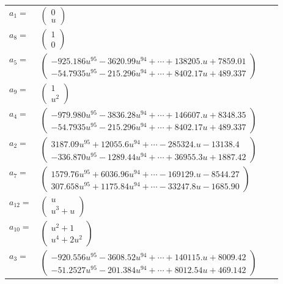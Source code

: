 \documentclass[1p]{elsarticle_modified}
\theoremstyle{definition}
\begin{document}
\begin{tabular}{m{7pt} m{180pt} m{7pt} m{180pt} }
\flushright $a_{1}=$&$\begin{pmatrix}0\\u\end{pmatrix}$ \\
\flushright $a_{8}=$&$\begin{pmatrix}1\\0\end{pmatrix}$ \\
\flushright $a_{5}=$&$\begin{pmatrix}-925.186 u^{95}-3620.99 u^{94}+\cdots+138205. u+7859.01\\-54.7935 u^{95}-215.296 u^{94}+\cdots+8402.17 u+489.337\end{pmatrix}$ \\
\flushright $a_{9}=$&$\begin{pmatrix}1\\u^2\end{pmatrix}$ \\
\flushright $a_{4}=$&$\begin{pmatrix}-979.980 u^{95}-3836.28 u^{94}+\cdots+146607. u+8348.35\\-54.7935 u^{95}-215.296 u^{94}+\cdots+8402.17 u+489.337\end{pmatrix}$ \\
\flushright $a_{2}=$&$\begin{pmatrix}3187.09 u^{95}+12055.6 u^{94}+\cdots-285324. u-13138.4\\-336.870 u^{95}-1289.44 u^{94}+\cdots+36955.3 u+1887.42\end{pmatrix}$ \\
\flushright $a_{7}=$&$\begin{pmatrix}1579.76 u^{95}+6036.96 u^{94}+\cdots-169129. u-8544.27\\307.658 u^{95}+1175.84 u^{94}+\cdots-33247.8 u-1685.90\end{pmatrix}$ \\
\flushright $a_{12}=$&$\begin{pmatrix}u\\u^3+u\end{pmatrix}$ \\
\flushright $a_{10}=$&$\begin{pmatrix}u^2+1\\u^4+2 u^2\end{pmatrix}$ \\
\flushright $a_{3}=$&$\begin{pmatrix}-920.556 u^{95}-3608.52 u^{94}+\cdots+140115. u+8009.42\\-51.2527 u^{95}-201.384 u^{94}+\cdots+8012.54 u+469.142\end{pmatrix}$ \\

\end{tabular}
\end{document}

